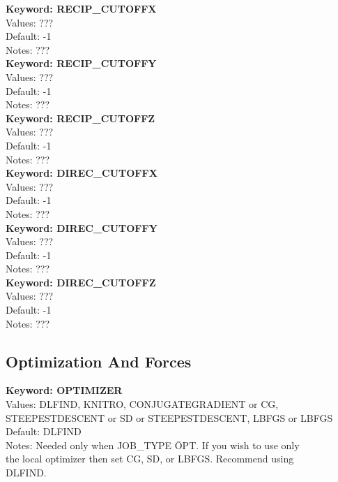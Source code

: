 \documentclass[11pt,letterpaper]{article}
\begin{document}
\begin{spacing}{1.0}
\noindent
\textbf{Keyword: RECIP\_CUTOFFX} \\
Values: ???\\
Default: -1\\
Notes:  ???\\

\noindent
\textbf{Keyword: RECIP\_CUTOFFY} \\
Values: ???\\
Default: -1\\
Notes:  ???\\

\noindent
\textbf{Keyword: RECIP\_CUTOFFZ} \\
Values: ???\\
Default: -1\\
Notes:  ???\\

\noindent
\textbf{Keyword: DIREC\_CUTOFFX} \\
Values: ???\\
Default: -1\\
Notes:  ???\\

\noindent
\textbf{Keyword: DIREC\_CUTOFFY} \\
Values: ???\\
Default: -1\\
Notes:  ???\\

\noindent
\textbf{Keyword: DIREC\_CUTOFFZ} \\
Values: ???\\
Default: -1\\
Notes:  ???\\



\subsection{Optimization And Forces}

\noindent
\textbf{Keyword: OPTIMIZER} \\
Values: DLFIND, KNITRO, CONJUGATEGRADIENT or CG, \\
        STEEPESTDESCENT or SD or STEEPEST\-DESCENT, LBFGS or L\-BFGS \\
Default: DLFIND \\
Notes: Needed only when JOB\_TYPE \= OPT. If you wish to use only \\ 
       the local optimizer then set CG, SD, or LBFGS. Recommend using \\
       DLFIND.\\



\end{spacing}
\end{document}

